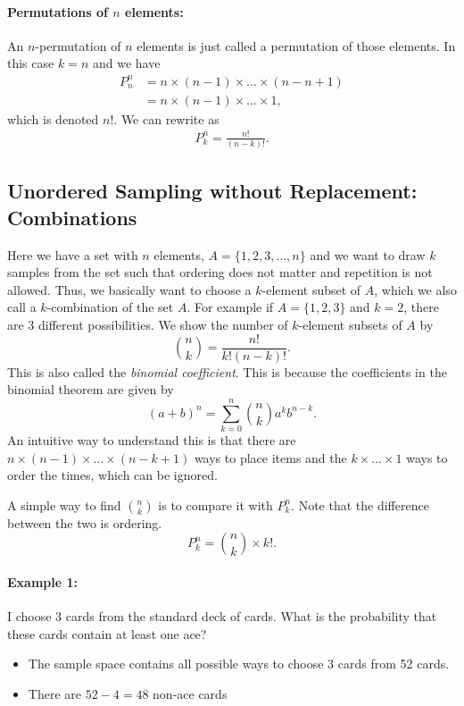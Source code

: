 \paragraph{Permutations of $n$ elements:} An $n$-permutation of $n$ elements is just called a permutation of those elements. In this case $k=n$ and we have
\begin{align*}
	P^n_n &= n\times (n-1)\times \dots \times (n-n+1)\\
		  &= n\times (n-1)\times \dots \times 1,
\end{align*}
which is denoted $n!$. We can rewrite as 
\begin{align*}
	P^n_k = \frac{n!}{(n-k)!}.
\end{align*}

\subsection{Unordered Sampling without Replacement: Combinations}
Here we have a set with $n$ elements, \eg $A=\{1,2,3,\dots, n\}$ and we want to draw $k$ samples from the set such that ordering does not matter and repetition is not allowed. Thus, we basically want to choose a $k$-element subset of $A$, which we also call a $k$-combination of the set $A$. For example if $A=\{1,2,3\}$ and $k=2$, there are 3 different possibilities. We show the number of $k$-element subsets of $A$ by
$$\binom{n}{k} = \frac{n!}{k!(n-k)!}.$$
This is also called the \textit{binomial coefficient}. This is because the coefficients in the binomial theorem are given by 
$$(a+b)^n = \sum_{k=0}^n\binom{n}{k}a^kb^{n-k}.$$
An intuitive way to understand this is that there are $n\times (n-1)\times \dots \times (n-k+1)$ ways to place items and the $k\times \dots \times 1$ ways to order the times, which can be ignored.  

A simple way to find $\binom{n}{k}$ is to compare it with $P_k^n$. Note that the difference between the two is ordering. 
$$P^n_k={n \choose k}\times k!.$$

\paragraph{Example 1:} I choose 3 cards from the standard deck of cards. What is the probability that these cards contain at least one ace?

\begin{itemize}
	\item The sample space contains all possible ways to choose 3 cards from 52 cards. 
	\item There are $52-4=48$ non-ace cards
\end{itemize}

